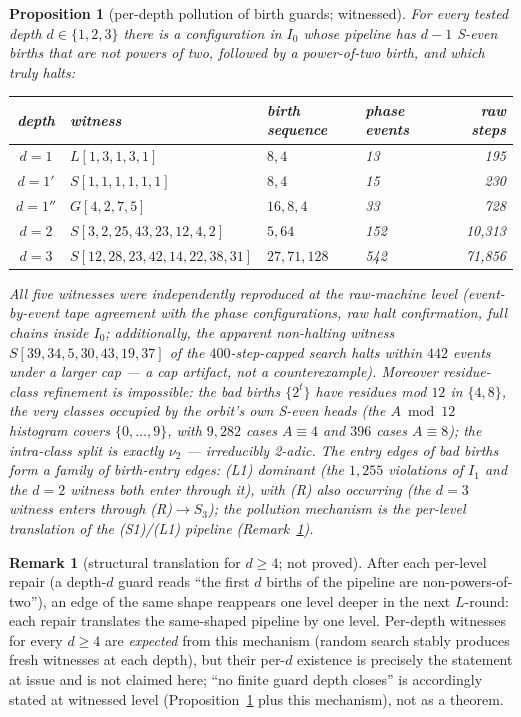 \documentclass[11pt]{amsart}
\newtheorem{proposition}[theorem]{Proposition}
\theoremstyle{definition}
\newtheorem{remark}[theorem]{Remark}
\begin{document}
\begin{proposition}[per-depth pollution of birth guards; witnessed]\label{prop:cascade}
For every tested depth $d\in\{1,2,3\}$ there is a configuration in $I_0$
whose pipeline has $d-1$ S-even births that are not powers of two, followed
by a power-of-two birth, and which truly halts:
\begin{center}
\begin{tabular}{clllr}
\toprule
depth & witness & birth sequence & phase events & raw steps\\
\midrule
$d{=}1$ & $L[1,3,1,3,1]$ & $8,4$ & 13 & 195\\
$d{=}1'$ & $S[1,1,1,1,1,1]$ & $8,4$ & 15 & 230\\
$d{=}1''$ & $G[4,2,7,5]$ & $16,8,4$ & 33 & 728\\
$d{=}2$ & $S[3,2,25,43,23,12,4,2]$ & $5,64$ & 152 & 10,313\\
$d{=}3$ & $S[12,28,23,42,14,22,38,31]$ & $27,71,128$ & 542 & 71,856\\
\bottomrule
\end{tabular}
\end{center}
All five witnesses were independently reproduced at the raw-machine level
(event-by-event tape agreement with the phase configurations, raw halt
confirmation, full chains inside $I_0$; additionally, the apparent
non-halting witness $S[39,34,5,30,43,19,37]$ of the $400$-step-capped search
halts within $442$ events under a larger cap --- a cap artifact, not a
counterexample). Moreover \emph{residue-class refinement is impossible}: the
bad births $\{2^{t}\}$ have residues mod $12$ in $\{4,8\}$, the very classes
occupied by the orbit's own S-even heads (the $A\bmod12$ histogram covers
$\{0,\dots,9\}$, with $9{,}282$ cases $A\equiv4$ and $396$ cases
$A\equiv8$); the intra-class split is exactly $\nu_2$ --- irreducibly
2-adic. The entry edges of bad births form a \emph{family of birth-entry
edges}: (L1) dominant (the $1{,}255$ violations of $I_1$ and the $d=2$
witness both enter through it), with (R) also occurring (the $d=3$ witness
enters through (R)$\to S_3$); the pollution mechanism is the per-level
translation of the (S1)/(L1) pipeline (Remark~\ref{rem:translate}).
\end{proposition}

\begin{remark}[structural translation for $d\ge4$; not proved]\label{rem:translate}
After each per-level repair (a depth-$d$ guard reads ``the first $d$ births
of the pipeline are non-powers-of-two''), an edge of the same shape
reappears one level deeper in the next $L$-round: each repair translates the
same-shaped pipeline by one level. Per-depth witnesses for every $d\ge4$ are
\emph{expected} from this mechanism (random search stably produces fresh
witnesses at each depth), but their per-$d$ existence is precisely the
statement at issue and is not claimed here; ``no finite guard depth closes''
is accordingly stated at witnessed level (Proposition~\ref{prop:cascade} plus
this mechanism), not as a theorem.
\end{remark}
\end{document}
